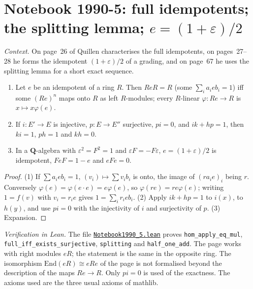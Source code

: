 \section[Notebook 1990-5: full idempotents; the splitting lemma]{Notebook 1990-5: full idempotents; the splitting lemma; $e = (1 + \varepsilon)/2$\protect{}}\label{sec:quillen-1990-5}

\emph{Context.} On page~26 of  Quillen characterises the full idempotents, on pages~27--28 he forms the idempotent $(1 + \varepsilon)/2$ of a grading, and on page~67 he uses the splitting lemma for a short exact sequence.

\begin{encadre}
\begin{theoreme}\label{thm:quillen-1990-5}\leavevmode
\begin{enumerate}
\item Let $e$ be an idempotent of a ring $R$. Then $ReR = R$ (some $\sum_ia_ieb_i = 1$) iff some $(Re)^n$ maps onto $R$ as left $R$-modules; every $R$-linear $\varphi : Re \to R$ is $x \mapsto x\varphi(e)$.
\item If $i : E' \to E$ is injective, $p : E \to E''$ surjective, $pi = 0$, and $ik + hp = 1$, then $ki = 1$, $ph = 1$ and $kh = 0$.
\item In a $\mathbf Q$-algebra with $\varepsilon^2 = F^2 = 1$ and $\varepsilon F = -F\varepsilon$, $e = (1 + \varepsilon)/2$ is idempotent, $FeF = 1 - e$ and $eFe = 0$.
\end{enumerate}
\end{theoreme}
\end{encadre}

\begin{proof}
(1) If $\sum a_ieb_i = 1$, $(v_i) \mapsto \sum v_ib_i$ is onto, the image of $(ra_ie)_i$ being $r$. Conversely $\varphi(e) = \varphi(e\cdot e) = e\varphi(e)$, so $\varphi(re) = re\varphi(e)$; writing $1 = f(v)$ with $v_i = r_ie$ gives $1 = \sum_ir_ieb_i$. (2) Apply $ik + hp = 1$ to $i(x)$, to $h(y)$, and use $pi = 0$ with the injectivity of $i$ and surjectivity of $p$. (3) Expansion.
\end{proof}

\emph{Verification in Lean.} The file \href{\leanblobmain/Notebook1990_5.lean}{\texttt{Notebook1990\_5.\allowbreak{}lean}} proves \texttt{hom\_apply\_eq\_mul}, \texttt{full\_iff\_exists\_surjective}, \texttt{splitting} and \texttt{half\_one\_add}. The page works with right modules $eR$; the statement is the same in the opposite ring. The isomorphism $\mathrm{End}(eR) \cong eRe$ of the page is not formalised beyond the description of the maps $Re \to R$. Only $pi = 0$ is used of the exactness. The axioms used are the three usual axioms of mathlib.

